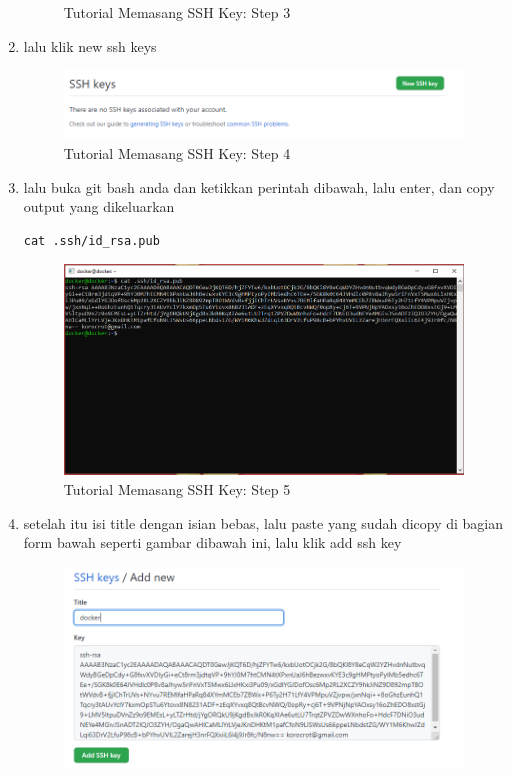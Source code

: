 \begin{enumerate}
\begin{figure}[H]
        \caption{Tutorial Memasang SSH Key: Step 3}
\end{figure}
\item lalu klik new ssh keys
\begin{figure}[H]
        \centerline{\includegraphics[scale=0.5]{figures/memasang-ssh-key/step4}}
        \caption{Tutorial Memasang SSH Key: Step 4}
\end{figure}
\item lalu buka git bash anda dan ketikkan perintah dibawah, lalu enter, dan copy output yang dikeluarkan
\begin{lstlisting}
cat .ssh/id_rsa.pub
\end{lstlisting}
\begin{figure}[H]
        \centerline{\includegraphics[scale=0.5]{figures/memasang-ssh-key/step5}}
        \caption{Tutorial Memasang SSH Key: Step 5}
\end{figure}
\item setelah itu isi title dengan isian bebas, lalu paste yang sudah dicopy di bagian form bawah seperti gambar dibawah ini, lalu klik add ssh key
\begin{figure}[H]
        \centerline{\includegraphics[scale=0.5]{figures/memasang-ssh-key/step6}}

\end{figure}
\end{enumerate}
